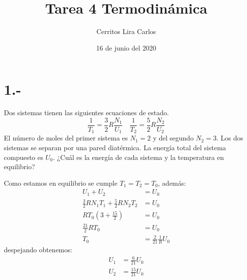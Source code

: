 \documentclass{article}
\title{Tarea 4 Termodinámica}
\author{Cerritos Lira Carlos}
\date{16 de junio del 2020}
\begin{document}
\maketitle
\section*{1.-}
Dos sistemas tienen las siguientes ecuaciones de estado. 
\[ \frac{1}{T_1} = \frac{3}{2}R\frac{N_1}{U_1} \quad 
\frac{1}{T_2} = \frac{5}{2}R\frac{N_2}{U_2} \]
El número de moles del primer sistema es $N_1 = 2$ y del segundo $N_2 = 3$. Los dos 
sistemas se separan por una pared diatérmica. La energía total del sistema compuesto es $U_0$. 
¿Cuál es la energía de cada sistema y la temperatura en equilibrio?
\begin{tcolorbox}[breakable]
    Como estamos en equilibrio se cumple $T_1=T_2=T_0$, además:
    \begin{align*}
        U_1+U_2 &= U_0 \\
        \frac{3}{2}RN_1T_1 + \frac{5}{2}RN_2T_2 &= U_0 \\
        RT_0(3+\frac{15}{2}) &= U_0 \\
        \frac{21}{2}RT_0 &= U_0 \\
        T_0 &= \frac{2}{21}\frac{1}{R} U_0
    \end{align*}
    despejando obtenemos:
    \begin{align*}
        U_1 &= \frac{6}{21}U_0 \\
        U_2 &= \frac{15}{21}U_0
    \end{align*}
\end{tcolorbox}
\end{document}
